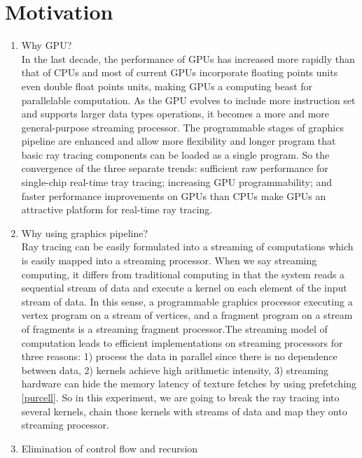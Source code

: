  \section{Motivation}
\begin{enumerate}
    \item Why GPU? \\
    In the last decade, the performance of GPUs has increased more rapidly than that of CPUs and most of current GPUs incorporate floating points units even double float points units, making GPUs a computing beast for parallelable computation. As the GPU evolves to include more instruction set and supports larger data types operations, it becomes a more and more general-purpose streaming processor. The programmable stages of graphics pipeline are enhanced and allow more flexibility and longer program that basic ray tracing components can be loaded as a single program. So the convergence of the three separate trends: sufficient raw performance for single-chip real-time tray tracing; increasing GPU programmability; and faster performance improvements on GPUs than CPUs make GPUs an attractive platform for real-time ray tracing.
    \item Why using graphics pipeline?\\
    Ray tracing can be easily formulated into a streaming of computations which is easily mapped into a streaming processor. When we say streaming computing, it differs from traditional computing in that the system reads a sequential stream of data and execute a kernel on each element of the input stream of data. In this sense, a programmable graphics processor executing a vertex program on a stream of vertices, and a fragment program on a stream of fragments is a streaming fragment processor.The streaming model of computation leads to efficient implementations on streaming processors for three reasons: 1) process the data in parallel since there is no dependence between data, 2) kernels achieve high arithmetic intensity, 3) streaming hardware can hide the memory latency of texture fetches by using prefetching \ref{purcell}. So in this experiment, we are going to break the ray tracing into several kernels, chain those kernels with streams of data and map they onto streaming processor.
    \item Elimination of control flow and recursion\\

\end{enumerate}
